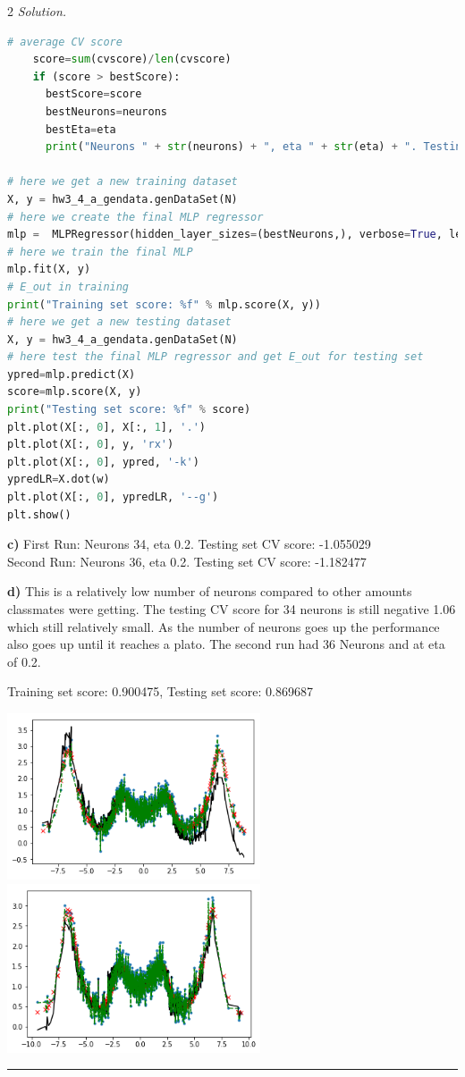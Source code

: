 \documentclass[12pt]{article}
\newcommand{\spacingfactor}{2}
\newcommand\myqed{}                 %
\newcommand{\printmyqed}[1][]       %
  {%
  \ifthenelse{\equal{#1}{Proof}}
  {\renewcommand{\myqed}{\qed}}
  {\renewcommand{\myqed}{}}
  }
\newenvironment{response}[1][\textit{Solution}]{%
  \printmyqed[#1]
  \begin{spacing}{\spacingfactor}
  \medskip                          %
  \noindent \textit{#1.}}{\myqed\end{spacing}\medskip\hrule}
\begin{document}
\begin{response}[Solution]
\begin{lstlisting}[language=Python,frame=single]
    # average CV score
    score=sum(cvscore)/len(cvscore)
    if (score > bestScore):
      bestScore=score
      bestNeurons=neurons
      bestEta=eta
      print("Neurons " + str(neurons) + ", eta " + str(eta) + ". Testing set CV score: %f" % score)

# here we get a new training dataset
X, y = hw3_4_a_gendata.genDataSet(N)
# here we create the final MLP regressor
mlp =  MLPRegressor(hidden_layer_sizes=(bestNeurons,), verbose=True, learning_rate_init=bestEta)
# here we train the final MLP
mlp.fit(X, y)
# E_out in training
print("Training set score: %f" % mlp.score(X, y)) 
# here we get a new testing dataset
X, y = hw3_4_a_gendata.genDataSet(N)
# here test the final MLP regressor and get E_out for testing set
ypred=mlp.predict(X)
score=mlp.score(X, y)
print("Testing set score: %f" % score)
plt.plot(X[:, 0], X[:, 1], '.')
plt.plot(X[:, 0], y, 'rx')
plt.plot(X[:, 0], ypred, '-k')
ypredLR=X.dot(w)
plt.plot(X[:, 0], ypredLR, '--g')
plt.show()
  \end{lstlisting}

  \textbf{c)} First Run: Neurons 34, eta 0.2. Testing set CV score: -1.055029\\
  Second Run: Neurons 36, eta 0.2. Testing set CV score: -1.182477

  \textbf{d)} This is a relatively low number of neurons compared
  to other amounts classmates were getting. The testing CV score for 
  34 neurons is still negative 1.06 which still relatively small. 
  As the number of neurons goes up the performance also goes up 
  until it reaches a plato. The second run had 36 Neurons and 
  at eta of 0.2. 

  Training set score: 0.900475, 
  Testing set score: 0.869687

  \includegraphics[width=75mm]{4a.png} 
  \includegraphics[width=75mm]{4b.png} 



\end{response}
\end{document}
